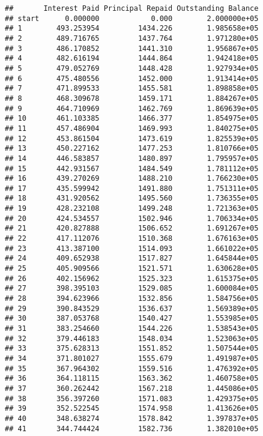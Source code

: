 \documentclass[]{article}
\begin{document}
\begin{verbatim}
##       Interest Paid Principal Repaid Outstanding Balance
## start      0.000000            0.000        2.000000e+05
## 1        493.253954         1434.226        1.985658e+05
## 2        489.716765         1437.764        1.971280e+05
## 3        486.170852         1441.310        1.956867e+05
## 4        482.616194         1444.864        1.942418e+05
## 5        479.052769         1448.428        1.927934e+05
## 6        475.480556         1452.000        1.913414e+05
## 7        471.899533         1455.581        1.898858e+05
## 8        468.309678         1459.171        1.884267e+05
## 9        464.710969         1462.769        1.869639e+05
## 10       461.103385         1466.377        1.854975e+05
## 11       457.486904         1469.993        1.840275e+05
## 12       453.861504         1473.619        1.825539e+05
## 13       450.227162         1477.253        1.810766e+05
## 14       446.583857         1480.897        1.795957e+05
## 15       442.931567         1484.549        1.781112e+05
## 16       439.270269         1488.210        1.766230e+05
## 17       435.599942         1491.880        1.751311e+05
## 18       431.920562         1495.560        1.736355e+05
## 19       428.232108         1499.248        1.721363e+05
## 20       424.534557         1502.946        1.706334e+05
## 21       420.827888         1506.652        1.691267e+05
## 22       417.112076         1510.368        1.676163e+05
## 23       413.387100         1514.093        1.661022e+05
## 24       409.652938         1517.827        1.645844e+05
## 25       405.909566         1521.571        1.630628e+05
## 26       402.156962         1525.323        1.615375e+05
## 27       398.395103         1529.085        1.600084e+05
## 28       394.623966         1532.856        1.584756e+05
## 29       390.843529         1536.637        1.569389e+05
## 30       387.053768         1540.427        1.553985e+05
## 31       383.254660         1544.226        1.538543e+05
## 32       379.446183         1548.034        1.523063e+05
## 33       375.628313         1551.852        1.507544e+05
## 34       371.801027         1555.679        1.491987e+05
## 35       367.964302         1559.516        1.476392e+05
## 36       364.118115         1563.362        1.460758e+05
## 37       360.262442         1567.218        1.445086e+05
## 38       356.397260         1571.083        1.429375e+05
## 39       352.522545         1574.958        1.413626e+05
## 40       348.638274         1578.842        1.397837e+05
## 41       344.744424         1582.736        1.382010e+05

\end{verbatim}
\end{document}
